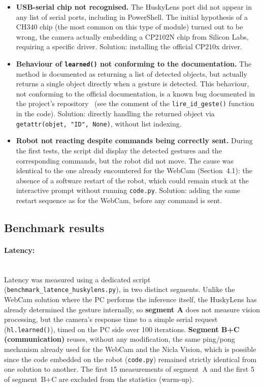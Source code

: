 \documentclass[12pt,a4paper]{report}
\begin{document}
	\begin{itemize}
		\item \textbf{USB-serial chip not recognised.} The HuskyLens port did not appear in any list of serial ports, including in PowerShell. The initial hypothesis of a CH340 chip (the most common on this type of module) turned out to be wrong, the camera actually embedding a CP2102N chip from Silicon Labs, requiring a specific driver. Solution: installing the official CP210x driver.
		\item \textbf{Behaviour of \texttt{learned()} not conforming to the documentation.} The method is documented as returning a list of detected objects, but actually returns a single object directly when a gesture is detected. This behaviour, not conforming to the official documentation, is a known bug documented in the project's repository~\cite{huskylenspython_issue18} (see the comment of the \texttt{lire\_id\_geste()} function in the code). Solution: directly handling the returned object via \texttt{getattr(objet, "ID", None)}, without list indexing.
		\item \textbf{Robot not reacting despite commands being correctly sent.} During the first tests, the script did display the detected gestures and the corresponding commands, but the robot did not move. The cause was identical to the one already encountered for the WebCam (Section~4.1): the absence of a software restart of the robot, which could remain stuck at the interactive prompt without running \texttt{code.py}. Solution: adding the same restart sequence as for the WebCam, before any command is sent.
	\end{itemize}
	
	\newpage
	
	\subsection*{Benchmark results}
	
	
	\paragraph{Latency:} \mbox{} \\
	Latency was measured using a dedicated script (\texttt{benchmark\_latence\_huskylens.py}), in two distinct segments. Unlike the WebCam solution where the PC performs the inference itself, the HuskyLens has already determined the gesture internally, so \textbf{segment A} does not measure vision processing, but the camera's response time to a simple serial request (\texttt{hl.learned()}), timed on the PC side over 100 iterations. \textbf{Segment B+C (communication)} reuses, without any modification, the same ping/pong mechanism already used for the WebCam and the Nicla Vision, which is possible since the code embedded on the robot (\texttt{code.py}) remained strictly identical from one solution to another. The first 15 measurements of segment~A and the first 5 of segment~B+C are excluded from the statistics (warm-up).
	
\end{document}
